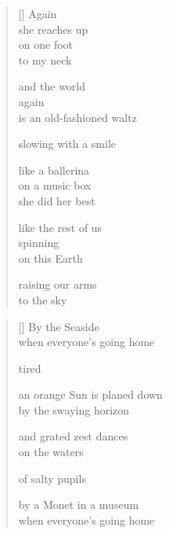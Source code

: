 \documentclass[12pt,a4paper]{article}
\begin{document}

\newpage

\poemtitle{}

\settowidth{\versewidth}{is an old-fashioned waltz}

\bigskip

\begin{verse}[\versewidth]
Again \\
she reaches up \\
on one foot \\
to my neck

and the world \\
again \\
is an old-fashioned waltz

slowing with a smile

like a ballerina \\
on a music box \\
she did her best

like the rest of us \\
spinning \\
on this Earth

raising our arms \\
to the sky
\end{verse}


\newpage

\poemtitle{}

\settowidth{\versewidth}{an orange Sun is planed down}

\bigskip

\begin{verse}[\versewidth]
By the Seaside \\
when everyone's going home

tired

an orange Sun is planed down \\
by the swaying horizon

and grated zest dances \\
on the waters

of salty pupils

by a Monet in a museum \\
when everyone's going home
\end{verse}

\end{document}
